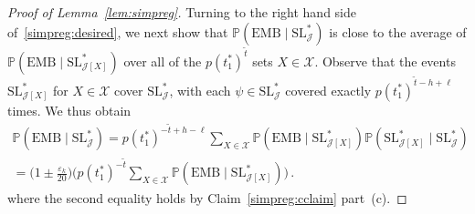 \documentclass[12pt,a4paper]{amsart}
\let\eps\varepsilon
\newcommand{\Prob}{\mathbb{P}}
\newcommand{\cJ}{\mathcal{J}}
\newcommand{\cX}{\mathcal{X}}
\newcommand{\HOM}{\text{EMB}}
\newcommand{\SLICE}{\mathrm{SL}}
\begin{document}
\begin{proof}[Proof of Lemma~\ref{lem:simpreg}]
  \smallskip 
Turning to the right hand side of~\eqref{simpreg:desired}, we next show that $\Prob(\HOM\mid\SLICE^*_{\cJ})$ is close to the average of $\Prob(\HOM\mid\SLICE^*_{\cJ[X]})$ over all of the $p(t_1^*)^{\tilde{t}}$ sets $X \in \cX$.
Observe that the events $\SLICE^*_{\cJ[X]}$ for $X \in \cX$ cover
  $\SLICE^*_{\cJ}$, with each $\psi\in\SLICE^*_{\cJ}$
  covered exactly $p(t_1^*)^{\tilde{t}-h+\ell}$ times. We thus obtain
  \begin{multline}\label{simpreg:avgX}
      \Prob(\HOM\mid\SLICE^*_{\cJ}) 
    = p(t_1^*)^{-\tilde{t}+h-\ell} \sum_{X \in \cX} 
    \Prob(\HOM\mid\SLICE^*_{\cJ[X]})
    \Prob(\SLICE^*_{\cJ[X]} \mid \SLICE^*_{\cJ})\,\\
   =\Big(1 \pm \tfrac{\eps_k}{20}\Big) \Big( p(t_1^*)^{-\tilde{t}}
\sum_{X \in \cX}
\Prob(\HOM\mid\SLICE^*_{\cJ[X]})
   \Big) 
   \,. 
  \end{multline}
where the second equality holds by Claim~\ref{simpreg:cclaim} part~(c). 
     

\end{proof}
\end{document}
